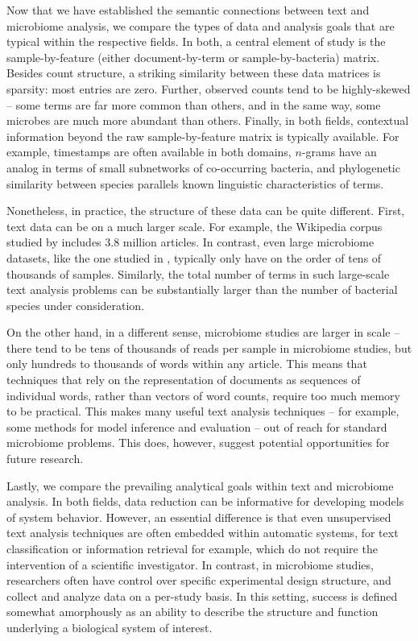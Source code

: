 \documentclass[oupdraft]{bio}
\begin{document}
Now that we have established the semantic connections between text and
microbiome analysis, we compare the types of data and analysis goals that are
typical within the respective fields. In both, a central element of study is the
sample-by-feature (either document-by-term or sample-by-bacteria) matrix.
Besides count structure, a striking similarity between these data matrices is
sparsity: most entries are zero. Further, observed counts tend to be
highly-skewed -- some terms are far more common than others, and in the same
way, some microbes are much more abundant than others. Finally, in both fields,
contextual information beyond the raw sample-by-feature matrix is typically
available. For example, timestamps are often available in both domains,
$n$-grams have an analog in terms of small subnetworks of co-occurring bacteria,
and phylogenetic similarity between species parallels known linguistic
characteristics of terms.

Nonetheless, in practice, the structure of these data can be quite different.
First, text data can be on a much larger scale. For example, the Wikipedia
corpus studied by \cite{hoffman2013stochastic} includes 3.8 million articles. In
contrast, even large microbiome datasets, like the one studied in
\citep{gilbert2014earth}, typically only have on the order of tens of thousands
of samples. Similarly, the total number of terms in such large-scale text
analysis problems can be substantially larger than the number of bacterial
species under consideration.

On the other hand, in a different sense, microbiome studies are larger in scale
-- there tend to be tens of thousands of reads per sample in microbiome studies,
but only hundreds to thousands of words within any article. This means that
techniques that rely on the representation of documents as sequences of
individual words, rather than vectors of word counts, require too much memory to
be practical. This makes many useful text analysis techniques -- for example,
some methods for model inference and evaluation \citep{wallach2009evaluation} --
out of reach for standard microbiome problems. This does, however, suggest
potential opportunities for future research.

Lastly, we compare the prevailing analytical goals within text and microbiome
analysis. In both fields, data reduction can be informative for developing
models of system behavior. However, an essential difference is that even
unsupervised text analysis techniques are often embedded within automatic
systems, for text classification or information retrieval for example, which do
not require the intervention of a scientific investigator. In contrast, in
microbiome studies, researchers often have control over specific experimental
design structure, and collect and analyze data on a per-study basis. In this
setting, success is defined somewhat amorphously as an ability to describe the
structure and function underlying a biological system of interest.
\end{document}
